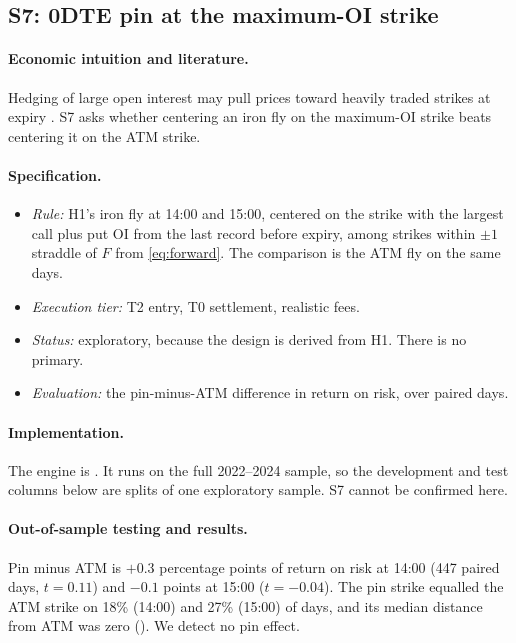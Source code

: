 \documentclass[../main.tex]{subfiles}
\begin{document}
\subsection{S7: 0DTE pin at the maximum-OI strike}\label{sec:s7}

\paragraph{Economic intuition and literature.}
Hedging of large open interest may pull prices toward heavily traded strikes at expiry \citep{ni2005}. S7 asks whether centering an iron fly on the maximum-OI strike beats centering it on the ATM strike.

\paragraph{Specification.}
\begin{itemize}
\item \emph{Rule:} H1's iron fly at 14:00 and 15:00, centered on the strike with the largest call plus put OI from the last record before expiry, among strikes within $\pm 1$ straddle of $F$ from \eqref{eq:forward}. The comparison is the ATM fly on the same days.
\item \emph{Execution tier:} T2 entry, T0 settlement, realistic fees.
\item \emph{Status:} exploratory, because the design is derived from H1. There is no primary.
\item \emph{Evaluation:} the pin-minus-ATM difference in return on risk, over paired days.
\end{itemize}

\paragraph{Implementation.}
The engine is . It runs on the full 2022--2024 sample, so the development and test columns below are splits of one exploratory sample. S7 cannot be confirmed here.

\paragraph{Out-of-sample testing and results.}
Pin minus ATM is $+0.3$ percentage points of return on risk at 14:00 (447 paired days, $t = 0.11$) and $-0.1$ points at 15:00 ($t = -0.04$). The pin strike equalled the ATM strike on 18\% (14:00) and 27\% (15:00) of days, and its median distance from ATM was zero (). We detect no pin effect.
\end{document}
